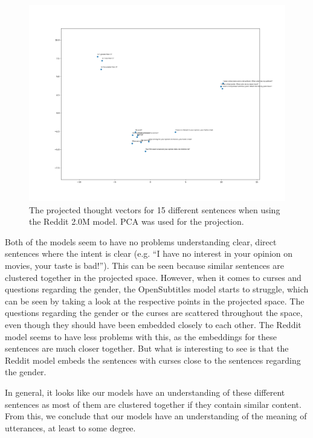 \begin{figure}[H]
	\centering
	\includegraphics[width=14cm]{img/reddit_thought_vector_embeddings.png}
	\caption{The projected thought vectors for 15 different sentences when using the Reddit 2.0M model. PCA was used for the projection.}
	\label{results:thougth_vectors:embeddings:reddit}
\end{figure}

Both of the models seem to have no problems understanding clear, direct sentences where the intent is clear (e.g. ``I have no interest in your opinion on movies, your taste is bad!''). This can be seen because similar sentences are clustered together in the projected space. However, when it comes to curses and questions regarding the gender, the OpenSubtitles model starts to struggle, which can be seen by taking a look at the respective points in the projected space. The questions regarding the gender or the curses are scattered throughout the space, even though they should have been embedded closely to each other. The Reddit model seems to have less problems with this, as the embeddings for these sentences are much closer together. But what is interesting to see is that the Reddit model embeds the sentences with curses close to the sentences regarding the gender.

In general, it looks like our models have an understanding of these different sentences as most of them are clustered together if they contain similar content. From this, we conclude that our models have an understanding of the meaning of utterances, at least to some degree.

